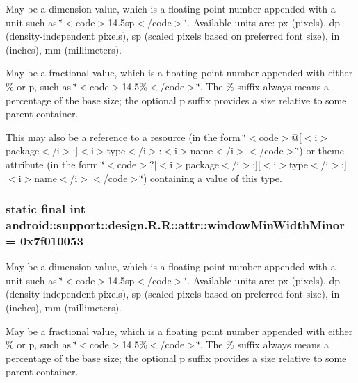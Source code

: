 May be a dimension value, which is a floating point number appended with a unit such as \char`\"{}$<$code$>$14.5sp$<$/code$>$\char`\"{}. Available units are: px (pixels), dp (density-independent pixels), sp (scaled pixels based on preferred font size), in (inches), mm (millimeters). 

May be a fractional value, which is a floating point number appended with either \% or p, such as \char`\"{}$<$code$>$14.5\%$<$/code$>$\char`\"{}. The \% suffix always means a percentage of the base size; the optional p suffix provides a size relative to some parent container. 

This may also be a reference to a resource (in the form \char`\"{}$<$code$>$@\mbox{[}$<$i$>$package$<$/i$>$:\mbox{]}$<$i$>$type$<$/i$>$:$<$i$>$name$<$/i$>$$<$/code$>$\char`\"{}) or theme attribute (in the form \char`\"{}$<$code$>$?\mbox{[}$<$i$>$package$<$/i$>$:\mbox{]}\mbox{[}$<$i$>$type$<$/i$>$:\mbox{]}$<$i$>$name$<$/i$>$$<$/code$>$\char`\"{}) containing a value of this type. \hypertarget{classandroid_1_1support_1_1design_1_1_r_1_1attr_36776b33e0d3df31275a44cbc9202694}{
\subsubsection[{windowMinWidthMinor}]{\setlength{\rightskip}{0pt plus 5cm}static final int android::support::design.R.R::attr::windowMinWidthMinor = 0x7f010053}}
\label{classandroid_1_1support_1_1design_1_1_r_1_1attr_36776b33e0d3df31275a44cbc9202694}


May be a dimension value, which is a floating point number appended with a unit such as \char`\"{}$<$code$>$14.5sp$<$/code$>$\char`\"{}. Available units are: px (pixels), dp (density-independent pixels), sp (scaled pixels based on preferred font size), in (inches), mm (millimeters). 

May be a fractional value, which is a floating point number appended with either \% or p, such as \char`\"{}$<$code$>$14.5\%$<$/code$>$\char`\"{}. The \% suffix always means a percentage of the base size; the optional p suffix provides a size relative to some parent container. 

